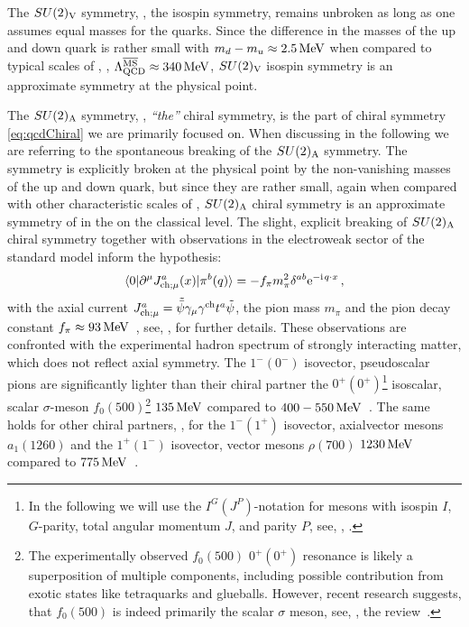The $SU(2)_{\mathrm{V}}$ symmetry, \ie{}, the isospin symmetry, remains unbroken as long as one assumes equal masses for the quarks.
Since the difference in the masses of the up and down quark is rather small with $m_d-m_u\approx 2.5\, \mathrm{MeV}$ when compared to typical scales of \qcd{}, \eg{}, $\Lambda_\mathrm{QCD}^{\overline{\mathrm{MS}}}\approx 340\,\mathrm{MeV}$, $SU(2)_{\mathrm{V}}$ isospin symmetry is an approximate symmetry at the physical point.\bigskip

The $SU(2)_{\mathrm{A}}$ symmetry, \ie{}, \textit{``the''} chiral symmetry, is the part of chiral symmetry \eqref{eq:qcdChiral} we are primarily focused on.
When discussing  in the following we are referring to the spontaneous breaking of the $SU(2)_{\mathrm{A}}$ symmetry. 
The symmetry is explicitly broken at the physical point by the non-vanishing masses of the up and down quark, but since they are rather small, again when compared with other characteristic scales of \qcd{}, $SU(2)_{\mathrm{A}}$ chiral symmetry is an approximate symmetry of \qcd{} in the \uv{} \dash{} on the classical level.
The slight, explicit breaking of $SU(2)_{\mathrm{A}}$ chiral symmetry together with observations in the electroweak sector of the standard model inform the \pcac{} hypothesis:
\begin{align}
	\langle 0|\partial^\mu J_{\mathrm{ch};\mu}^a(x)|\pi^b(q) \rangle= - f_\pi m_\pi^2 \delta^{a b}\mathrm{e}^{-\mathrm{i}\mkern1mu{}\mskip1.0mu{} q\cdot x}\, ,
	\label{eq:PCAC}
\end{align}
with the axial current $J_{\mathrm{ch};\mu}^a=\tilde{\bar{\psi}}\gamma_\mu \gamma^{\mathrm{ch}} t^{a} \tilde{\psi}$, the pion mass $m_\pi$ and the pion decay constant $f_\pi\approx 93\,\mathrm{MeV}$~\cite{ParticleDataGroup2022Aug}, see, \eg{},  for further details.
These observations are confronted with the experimental hadron spectrum of strongly interacting matter, which does not reflect axial symmetry.
The $1^-(0^-)$ isovector, pseudoscalar pions are significantly lighter than their chiral partner the  $0^+(0^+)$\footnote{
	In the following we will use the $I^G(J^P)$-notation for mesons with isospin $I$, $G$-parity, total angular momentum $J$, and parity $P$, see, \eg{}, .
} isoscalar, scalar $\sigma$-meson $f_0(500)$\footnote{
	The experimentally observed $f_0(500)$ $0^+(0^+)$ resonance is likely a superposition of multiple components, including possible contribution from exotic states like tetraquarks and glueballs.
	However, recent research suggests, that $f_0(500)$ is indeed primarily the scalar $\sigma$ meson, see, \eg{}, the review~\cite{Pelaez:2015qba}.%
} \dash{} $135\, \mathrm{MeV}$ compared to $400-550\,\mathrm{MeV}$~\cite{ParticleDataGroup2022Aug}.
The same holds for other chiral partners, \eg{}, for the $1^-(1^+)$ isovector, axialvector mesons $a_1(1260)$ and the $1^+(1^-)$ isovector, vector mesons $\rho(700)$ \dash{}  $1230\, \mathrm{MeV}$ compared to $775\,\mathrm{MeV}$~\cite{ParticleDataGroup2022Aug}.

